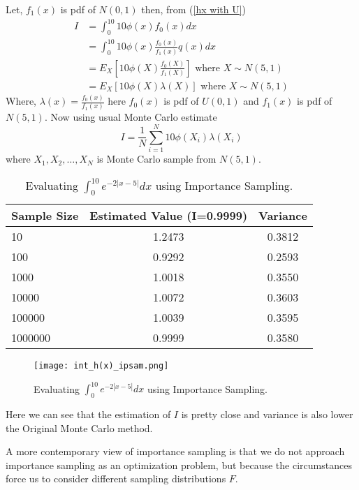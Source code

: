 \begin{example}
	Let, $f_1(x)$ is pdf of $N(0,1)$ then, from (\ref{hx with U})
	\begin{align*}
		I & = \int_{0}^{10} 10\phi(x) f_0(x) dx                                            \\
		  & = \int_{0}^{10} 10 \phi(x) \frac{f_0(x)}{f_1(x)} q(x)dx                          \\
		  & = E_X\left[ 10 \phi(X) \frac{f_0(X)}{f_1(X)} \right] \text{ where } X\sim N(5,1) \\
		  & = E_X\left[ 10 \phi(X) \lambda(X) \right]\text{ where } X\sim N(5,1)
	\end{align*}
	Where, $\lambda(x) = \frac{f_0(x)}{f_1(x)}$ here $f_0(x)$ is pdf of $U(0,1)$ and $f_1(x)$ is pdf of $N(5,1)$. Now using usual Monte Carlo estimate
	\[
		I = \frac{1}{N} \sum_{i = 1}^{N} 10 \phi(X_i) \lambda(X_i)
	\]
	where $X_1, X_2,\ldots,X_N$ is Monte Carlo sample from $N(5,1)$.
	\begin{table}[H]
		\centering
		\begin{tabular}{l c c}
			\hline
			Sample Size & Estimated Value (I=0.9999) & Variance \\
			\hline
			10          & 1.2473                     & 0.3812   \\
			100         & 0.9292                     & 0.2593   \\
			1000        & 1.0018                     & 0.3550   \\
			10000       & 1.0072                     & 0.3603   \\
			100000      & 1.0039                     & 0.3595   \\
			1000000     & 0.9999                     & 0.3580   \\
			\hline
		\end{tabular}
		\caption{Evaluating $\int_{0}^{10} e^{-2 |x-5|} dx$ using Importance Sampling.}
		\label{tab:mytable}
	\end{table}
	
	\begin{figure}[H]
		\centering
		\texttt{[image: int\_h(x)\_ipsam.png]}
		\caption{Evaluating $\int_{0}^{10} e^{-2 |x-5|} dx$ using Importance Sampling.}
		\label{fig:impotrancesampling1}
	\end{figure}
	Here we can see that the estimation of $I$ is pretty close and variance is also
	lower the Original Monte Carlo method.
\end{example}

A more contemporary view of importance sampling is that we do not approach
importance sampling as an optimization problem, but because the circumstances
force us to consider different sampling distributions $F$.

